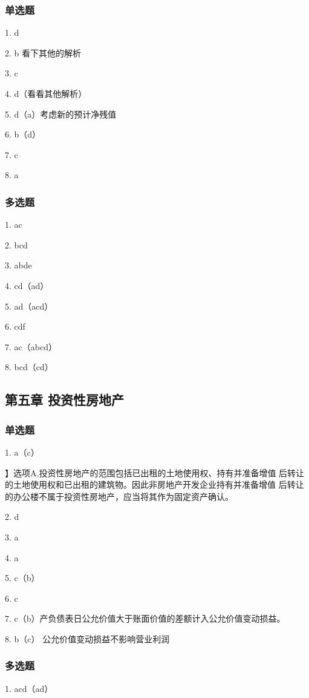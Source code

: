 \documentclass[UTF8,12pt]{ctexart}
\numberwithin{equation}{section} %
\numberwithin{figure}{section}
\numberwithin{table}{section}
\begin{document}
	\subsubsection{单选题}
	1. d
	
	2. b 看下其他的解析
	
	3. c
	
	4. d（看看其他解析）
	
	5. d（a）考虑新的预计净残值
	
	6. b（d）
	
	7. c
	
	8. a
	
	\subsubsection{多选题}
	1. ac
	
	2. bcd
	
	3. abde
	
	4. cd（ad）
	
	5. ad（acd）
	
	6. cdf
	
	7. ac（abcd）
	
	8. bcd（cd）
	
	
	\subsection{第五章 投资性房地产}
	
	\subsubsection{单选题}
	1. a（c）
	
	】选项A,投资性房地产的范围包括已出租的土地使用权、持有并准备增值
	后转让的土地使用权和已出租的建筑物。因此非房地产开发企业持有并准备增值
	后转让的办公楼不属于投资性房地产，应当将其作为固定资产确认。
	
	2. d
	
	3. a
	
	4. a
	
	5. c（b）
	
	6. c
	
	7. c（b）产负债表日公允价值大于账面价值的差额计入公允价值变动损益。
	
	8. b（c） 公允价值变动损益不影响营业利润
	
	\subsubsection{多选题}
	1. acd（ad）
	
\end{document}
